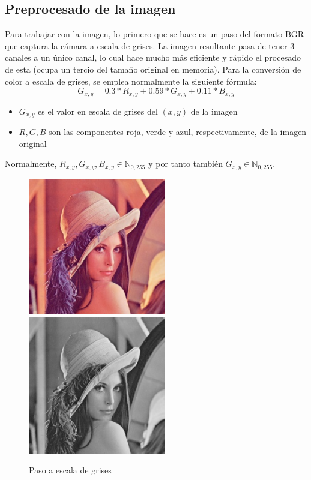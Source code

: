 \subsection{Preprocesado de la imagen}
Para trabajar con la imagen, lo primero que se hace es un paso del formato BGR que captura la cámara a escala de grises. La imagen resultante pasa de tener 3 canales a un único canal, lo cual hace mucho más eficiente y rápido el procesado de esta (ocupa un tercio del tamaño original en memoria). Para la conversión de color a escala de grises, se emplea normalmente la siguiente fórmula:
\[
	G_{x,y}= 0.3 * R_{x,y} + 0.59 * G_{x,y} + 0.11 * B_{x,y}
\]
\begin{itemize}
	\item{$G_{x,y}$ es el valor en escala de grises del $(x,y)$ de la imagen }
	\item{$R, G, B$ son las componentes roja, verde y azul, respectivamente, de la imagen original}
\end{itemize}
Normalmente, $R_{x,y}, G_{x,y}, B_{x,y} \in \mathbb{N}_{0,255}$ y por tanto también $G_{x,y} \in \mathbb{N}_{0,255}$.

\begin{figure}[h!]
	\centering
	\includegraphics[height=6cm]{imagenes/lena_color_256.jpg}
	\includegraphics[height=6cm]{imagenes/lena_gray_256.jpg}
	\caption{Paso a escala de grises}
	\label{fig:grayscale_conversion}
\end{figure}

